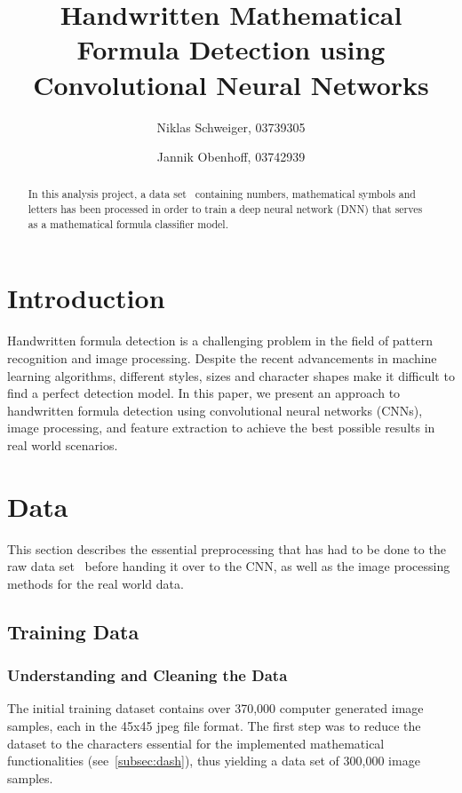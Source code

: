 \documentclass[@CLASSOPTIONS@]{tumarticle}
\title{Handwritten Mathematical Formula Detection using Convolutional Neural Networks}
\author[affil={1}, email={niklas.schweiger@tum.de}]{Niklas Schweiger, 03739305}
\author[affil={1}, email={jannik.obenhoff@tum.de}]{Jannik Obenhoff, 03742939}
\affil{Department of Electrical and Computer Engineering, Technical
  University of Munich, Arcisstr. 21, 80333 Munich, Germany}
\begin{document}
\twocolumn

\maketitle
\begin{abstract}
  In this analysis project, a data set~\cite{kaggledataset} containing numbers, mathematical
  symbols and letters has been processed in order to train a deep neural network (DNN) that
  serves as a mathematical formula classifier model.

\end{abstract}

\section{Introduction}

Handwritten formula detection is a challenging problem in the field of pattern recognition and
image processing.
Despite the recent advancements in machine learning algorithms, different styles, sizes and character
shapes make it difficult to find a perfect detection model.
In this paper, we present an approach to handwritten formula detection using convolutional
neural networks (CNNs), image processing, and feature extraction to achieve the best possible results
in real world scenarios.

\section{Data}
\label{sec:measures}

This section describes the essential preprocessing that has had to be done to the raw
data set~\cite{kaggledataset} before handing it over to the CNN,
as well as the image processing methods for the real world data.

\subsection{Training Data}
\subsubsection{Understanding and Cleaning the Data}

The initial training dataset contains over 370,000 computer generated image samples, each in the 45x45 jpeg file format.
The first step was to reduce the dataset to the characters essential for the
implemented mathematical functionalities (see~\ref{subsec:dash}),
thus yielding a data set of 300,000 image samples.
\end{document}
